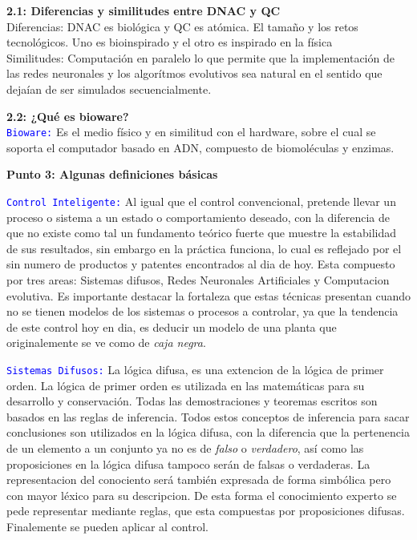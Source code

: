 \documentclass[10pt,onecolumn,twoside,letterpaper]{article}
\begin{document}
\par{\bf 2.1: Diferencias y similitudes entre DNAC y QC}\\
Diferencias: DNAC es biol\'ogica y QC es at\'omica. El tama\~no y los retos tecnol\'ogicos. Uno es bioinspirado y el otro es inspirado en la f\'isica\\
Similitudes: Computaci\'on en paralelo lo que permite que la implementaci\'on de las redes neuronales y los algor\'itmos evolutivos sea natural en el sentido que deja\'ian de ser simulados secuencialmente.
\par{\bf 2.2: ¿Qu\'e es bioware?}\\
\textcolor{blue}{\texttt{Bioware:}} Es el medio f\'isico y en similitud con el hardware, sobre el cual se soporta el computador basado en ADN, compuesto de biomol\'eculas y enzimas.\\
\par{\bf \large Punto 3: Algunas definiciones b\'asicas}\\
\par \textcolor{blue}{\texttt{Control Inteligente:}} Al igual que el control convencional, pretende llevar un proceso o sistema a un estado o comportamiento deseado, con la diferencia de que no existe como tal un fundamento te\'orico fuerte que muestre la estabilidad de sus resultados, sin embargo en la pr\'actica funciona, lo cual es reflejado por el sin numero de productos y patentes encontrados al dia de hoy. Esta compuesto por tres areas: Sistemas difusos, Redes Neuronales Artificiales y Computacion evolutiva. Es importante destacar la fortaleza que estas t\'ecnicas presentan cuando no se tienen modelos de los sistemas o procesos a controlar, ya que la tendencia de este control hoy en dia, es deducir un modelo de una planta que originalemente se ve como de \emph{caja negra}.
\par \textcolor{blue}{\texttt{Sistemas Difusos:}} La l\'ogica difusa, es una extencion de la l\'ogica de primer orden. La l\'ogica de primer orden es utilizada en las matem\'aticas para su desarrollo y conservaci\'on. Todas las demostraciones y teoremas escritos son basados en las reglas de inferencia. Todos estos conceptos de inferencia para sacar conclusiones son utilizados en la l\'ogica difusa, con la diferencia que la pertenencia de un elemento a un conjunto ya no es de \emph{falso} o \emph{verdadero}, as\'i como las proposiciones en la l\'ogica difusa tampoco ser\'an de falsas o verdaderas. La representacion del conociento ser\'a tambi\'en expresada de forma simb\'olica pero con mayor l\'exico para su descripcion. De esta forma el conocimiento experto se pede representar mediante reglas, que esta compuestas por proposiciones difusas. Finalemente se pueden aplicar al control.
\end{document}
